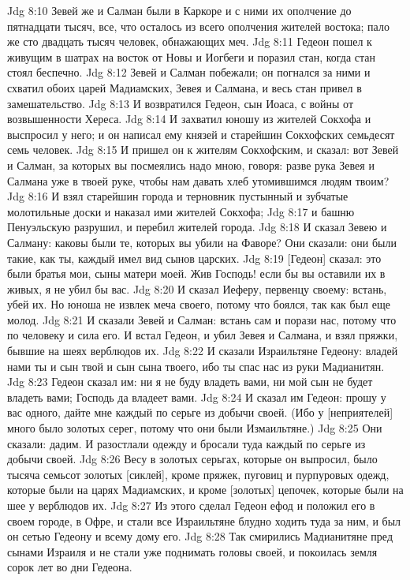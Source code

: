 Jdg 8:10  Зевей же и Салман были в Каркоре и с ними их ополчение до пятнадцати тысяч, все, что осталось из всего ополчения жителей востока; пало же сто двадцать тысяч человек, обнажающих меч.
Jdg 8:11  Гедеон пошел к живущим в шатрах на восток от Новы и Иогбеги и поразил стан, когда стан стоял беспечно.
Jdg 8:12  Зевей и Салман побежали; он погнался за ними и схватил обоих царей Мадиамских, Зевея и Салмана, и весь стан привел в замешательство.
Jdg 8:13  И возвратился Гедеон, сын Иоаса, с войны от возвышенности Хереса.
Jdg 8:14  И захватил юношу из жителей Сокхофа и выспросил у него; и он написал ему князей и старейшин Сокхофских семьдесят семь человек.
Jdg 8:15  И пришел он к жителям Сокхофским, и сказал: вот Зевей и Салман, за которых вы посмеялись надо мною, говоря: разве рука Зевея и Салмана уже в твоей руке, чтобы нам давать хлеб утомившимся людям твоим?
Jdg 8:16  И взял старейшин города и терновник пустынный и зубчатые молотильные доски и наказал ими жителей Сокхофа;
Jdg 8:17  и башню Пенуэльскую разрушил, и перебил жителей города.
Jdg 8:18  И сказал Зевею и Салману: каковы были те, которых вы убили на Фаворе? Они сказали: они были такие, как ты, каждый имел вид сынов царских.
Jdg 8:19  [Гедеон] сказал: это были братья мои, сыны матери моей. Жив Господь! если бы вы оставили их в живых, я не убил бы вас.
Jdg 8:20  И сказал Иеферу, первенцу своему: встань, убей их. Но юноша не извлек меча своего, потому что боялся, так как был еще молод.
Jdg 8:21  И сказали Зевей и Салман: встань сам и порази нас, потому что по человеку и сила его. И встал Гедеон, и убил Зевея и Салмана, и взял пряжки, бывшие на шеях верблюдов их.
Jdg 8:22  И сказали Израильтяне Гедеону: владей нами ты и сын твой и сын сына твоего, ибо ты спас нас из руки Мадианитян.
Jdg 8:23  Гедеон сказал им: ни я не буду владеть вами, ни мой сын не будет владеть вами; Господь да владеет вами.
Jdg 8:24  И сказал им Гедеон: прошу у вас одного, дайте мне каждый по серьге из добычи своей. (Ибо у [неприятелей] много было золотых серег, потому что они были Измаильтяне.)
Jdg 8:25  Они сказали: дадим. И разостлали одежду и бросали туда каждый по серьге из добычи своей.
Jdg 8:26  Весу в золотых серьгах, которые он выпросил, было тысяча семьсот золотых [сиклей], кроме пряжек, пуговиц и пурпуровых одежд, которые были на царях Мадиамских, и кроме [золотых] цепочек, которые были на шее у верблюдов их.
Jdg 8:27  Из этого сделал Гедеон ефод и положил его в своем городе, в Офре, и стали все Израильтяне блудно ходить туда за ним, и был он сетью Гедеону и всему дому его.
Jdg 8:28  Так смирились Мадианитяне пред сынами Израиля и не стали уже поднимать головы своей, и покоилась земля сорок лет во дни Гедеона.
